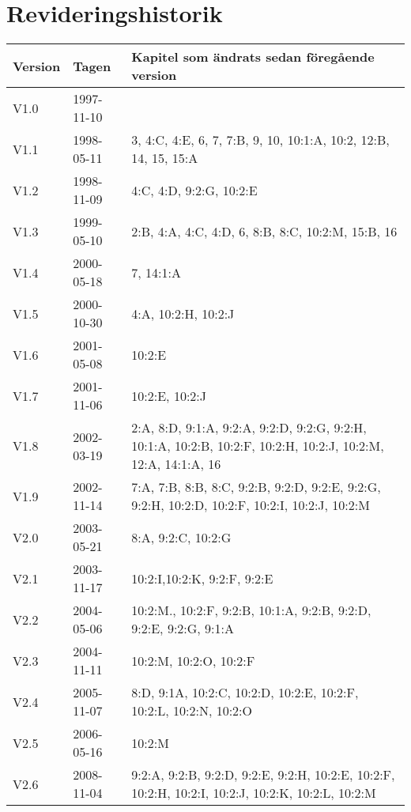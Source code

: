 \documentclass[10pt]{article}
\begin{document}
\clearpage

\section*{Revideringshistorik}
\begin{center}
\begin{tabular}{| l | l | p{10cm} |}
    \hline
    Version & Tagen & Kapitel som ändrats sedan föregående version \\
    \hline
    V1.0 & 1997-11-10 & \\
    \hline
    V1.1 & 1998-05-11 & 3, 4:C, 4:E, 6, 7, 7:B, 9, 10, 10:1:A, 10:2, 12:B,
    14, 15, 15:A \\
    \hline
    V1.2 & 1998-11-09 & 4:C, 4:D, 9:2:G, 10:2:E \\
    \hline
    V1.3 & 1999-05-10 & 2:B, 4:A, 4:C, 4:D, 6, 8:B, 8:C, 10:2:M, 15:B, 16 \\
    \hline
    V1.4 & 2000-05-18 & 7, 14:1:A \\
    \hline
    V1.5 & 2000-10-30 & 4:A, 10:2:H, 10:2:J \\
    \hline
    V1.6 & 2001-05-08 & 10:2:E \\
    \hline
    V1.7 & 2001-11-06 & 10:2:E, 10:2:J \\
    \hline
    V1.8 & 2002-03-19 & 2:A, 8:D, 9:1:A, 9:2:A, 9:2:D, 9:2:G, 9:2:H, 10:1:A,
    10:2:B, 10:2:F, 10:2:H, 10:2:J, 10:2:M, 12:A, 14:1:A, 16 \\
    \hline
    V1.9 & 2002-11-14 & 7:A, 7:B, 8:B, 8:C, 9:2:B, 9:2:D, 9:2:E, 9:2:G,
    9:2:H, 10:2:D, 10:2:F, 10:2:I, 10:2:J, 10:2:M \\
    \hline
    V2.0 & 2003-05-21 & 8:A, 9:2:C, 10:2:G \\
    \hline
    V2.1 & 2003-11-17 & 10:2:I,10:2:K, 9:2:F, 9:2:E \\
    \hline
    V2.2 & 2004-05-06 & 10:2:M., 10:2:F, 9:2:B, 10:1:A, 9:2:B, 9:2:D, 9:2:E,
    9:2:G, 9:1:A \\
    \hline
    V2.3 & 2004-11-11 & 10:2:M, 10:2:O, 10:2:F \\
    \hline
    V2.4 & 2005-11-07 & 8:D, 9:1A, 10:2:C, 10:2:D, 10:2:E, 10:2:F, 10:2:L,
    10:2:N, 10:2:O \\
    \hline
    V2.5 & 2006-05-16 & 10:2:M \\
    \hline
    V2.6 & 2008-11-04 & 9:2:A, 9:2:B, 9:2:D, 9:2:E, 9:2:H, 10:2:E, 10:2:F,
    10:2:H, 10:2:I, 10:2:J, 10:2:K, 10:2:L, 10:2:M \\

\end{tabular}
\end{center}
\end{document}
